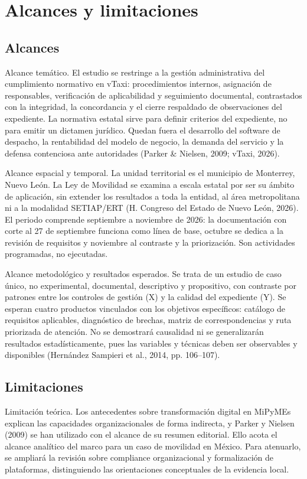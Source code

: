 {\section{Alcances y limitaciones}
\subsection{Alcances}
Alcance temático. El estudio se restringe a la gestión administrativa del cumplimiento normativo en vTaxi: procedimientos internos, asignación de responsables, verificación de aplicabilidad y seguimiento documental, contrastados con la integridad, la concordancia y el cierre respaldado de observaciones del expediente. La normativa estatal sirve para definir criterios del expediente, no para emitir un dictamen jurídico. Quedan fuera el desarrollo del software de despacho, la rentabilidad del modelo de negocio, la demanda del servicio y la defensa contenciosa ante autoridades (Parker \& Nielsen, 2009; vTaxi, 2026).


Alcance espacial y temporal. La unidad territorial es el municipio de Monterrey, Nuevo León. La Ley de Movilidad se examina a escala estatal por ser su ámbito de aplicación, sin extender los resultados a toda la entidad, al área metropolitana ni a la modalidad SETIAP/ERT (H. Congreso del Estado de Nuevo León, 2026). El periodo comprende septiembre a noviembre de 2026: la documentación con corte al 27 de septiembre funciona como línea de base, octubre se dedica a la revisión de requisitos y noviembre al contraste y la priorización. Son actividades programadas, no ejecutadas.


Alcance metodológico y resultados esperados. Se trata de un estudio de caso único, no experimental, documental, descriptivo y propositivo, con contraste por patrones entre los controles de gestión (X) y la calidad del expediente (Y). Se esperan cuatro productos vinculados con los objetivos específicos: catálogo de requisitos aplicables, diagnóstico de brechas, matriz de correspondencias y ruta priorizada de atención. No se demostrará causalidad ni se generalizarán resultados estadísticamente, pues las variables y técnicas deben ser observables y disponibles (Hernández Sampieri et al., 2014, pp. 106–107).


\subsection{Limitaciones}
Limitación teórica. Los antecedentes sobre transformación digital en MiPyMEs explican las capacidades organizacionales de forma indirecta, y Parker y Nielsen (2009) se han utilizado con el alcance de su resumen editorial. Ello acota el alcance analítico del marco para un caso de movilidad en México. Para atenuarlo, se ampliará la revisión sobre compliance organizacional y formalización de plataformas, distinguiendo las orientaciones conceptuales de la evidencia local.


}

